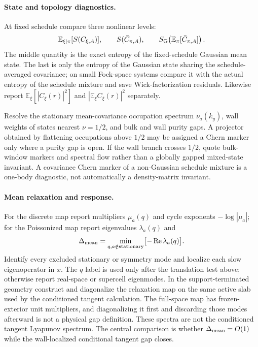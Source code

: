 \documentclass[aps,prx,onecolumn,nofootinbib,superscriptaddress,longbibliography]{revtex4-2}
\newcommand{\E}{\mathbb{E}}
\begin{document}
\paragraph{State and topology diagnostics.}
At fixed schedule compare three nonlinear levels:
\begin{equation}
 \E_{\xi|\pi}[S(C_{\xi,A})],\qquad
 S(\bar C_{\pi,A}),\qquad
 S_{\rm G}\!\left(\E_\pi[\bar C_{\pi,A}]\right).
 \label{eq:three-mean-entropies}
\end{equation}
The middle quantity is the exact entropy of the fixed-schedule Gaussian mean state.  The
last is only the entropy of the Gaussian state sharing the schedule-averaged covariance;
on small Fock-space systems compare it with the actual entropy of the schedule mixture and
save Wick-factorization residuals.  Likewise report
$\E_\xi[|C_\xi(r)|^2]$ and $|\E_\xi C_\xi(r)|^2$ separately.

Resolve the stationary mean-covariance occupation spectrum $\nu_a(k_y)$, wall weights of
states nearest $\nu=1/2$, and bulk and wall purity gaps.  A projector obtained by flattening
occupations above $1/2$ may be assigned a Chern marker only where a purity gap is open.
If the wall branch crosses $1/2$, quote bulk-window markers and spectral flow rather than a
globally gapped mixed-state invariant.  A covariance Chern marker of a non-Gaussian
schedule mixture is a one-body diagnostic, not automatically a density-matrix invariant.

\paragraph{Mean relaxation and response.}
For the discrete map report multipliers $\mu_a(q)$ and cycle exponents
$-\log|\mu_a|$; for the Poissonized map report eigenvalues $\lambda_a(q)$ and
\begin{equation}
 \Delta_{\rm mean}
 =\min_{q,a\notin{\rm stationary}}\bigl[-\Re\lambda_a(q)\bigr].
 \label{eq:mean-gap}
\end{equation}
Identify every excluded stationary or symmetry mode and localize each slow eigenoperator
in $x$.  The $q$ label is used only after the translation test above; otherwise report
real-space or supercell eigenmodes.  In the support-terminated geometry construct and
diagonalize the relaxation map on the same active slab used by the conditioned tangent
calculation.  The full-space map has frozen-exterior unit multipliers, and diagonalizing it
first and discarding those modes afterward is not a physical gap definition.  These spectra
are not the conditioned tangent Lyapunov spectrum.  The central
comparison is whether $\Delta_{\rm mean}=O(1)$ while the wall-localized conditional
tangent gap closes.
\end{document}
